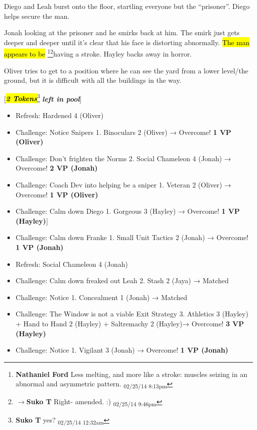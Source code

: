 Diego and Leah burst onto the floor, startling everyone but the ``prisoner''.  Diego helps secure the man.



Jonah looking at the prisoner and he smirks back at him.  The smirk just gets deeper and deeper until it's clear that his face is distorting abnormally.  \hl{The man appears to be }\footnote{\textbf{Nathaniel Ford }Less melting, and more like a stroke: muscles seizing in an abnormal and asymmetric pattern. \textsubscript{02/25/14 8:13pm}}\footnote{$\rightarrow$\textbf{Suko T }Right- amended. :) \textsubscript{02/25/14 9:46pm}}having a stroke.  Hayley backs away in horror.



Oliver tries to get to a position where he can see the yard from a lower level/the ground, but it is difficult with all the buildings in the way.



{[}\textit{\textbf{\hl{2 Tokens}}}\footnote{\textbf{Suko T }yes? \textsubscript{02/25/14 12:32am}}\textit{\textbf{ left in pool}}{]}








\begin{itemize}
\item Refresh: Hardened 4 (Oliver)
\item Challenge: Notice Snipers 1. Binoculars 2 (Oliver) → Overcome! \textbf{1 VP (Oliver)}
\item Challenge: Don't frighten the Norms 2.  Social Chameleon 4 (Jonah) → Overcome! \textbf{2 VP (Jonah)}
\item Challenge: Coach Dev into helping be a sniper 1. Veteran 2 (Oliver) → Overcome! \textbf{1 VP (Oliver)}
\item Challenge: Calm down Diego 1. Gorgeous 3 (Hayley) → Overcome! \textbf{1 VP (Hayley)}{]} 
\item Challenge: Calm down Franke 1. Small Unit Tactics 2 (Jonah) → Overcome! \textbf{1 VP (Jonah)}
\item Refresh: Social Chameleon 4 (Jonah)
\item Challenge: Calm down freaked out Leah 2. Stash 2 (Jaya) →  Matched
\item Challenge: Notice 1. Concealment 1 (Jonah) → Matched
\item Challenge: The Window is not a viable Exit Strategy 3. Athletics 3 (Hayley) + Hand to Hand 2 (Hayley) + Saltremachy 2 (Hayley)→ Overcome! \textbf{3 VP (Hayley)}
\item Challenge: Notice 1. Vigilant 3 (Jonah)  → Overcome! \textbf{1 VP (Jonah)}
\end{itemize}





